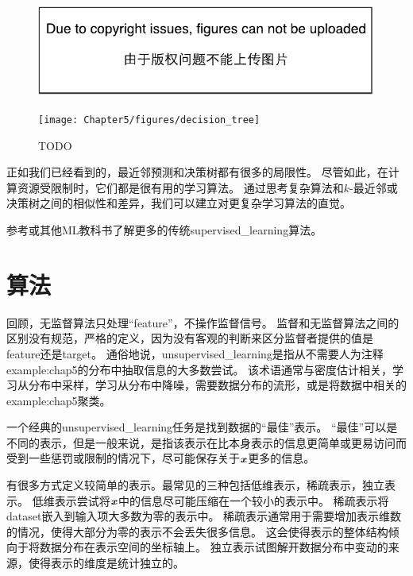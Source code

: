 \begin{figure}[!htb]
\ifOpenSource
\centerline{\includegraphics{figure.pdf}}
\else
\centerline{\texttt{[image: Chapter5/figures/decision\_tree]}}
\fi
\caption{TODO}
\label{fig:chap5_decision_tree}
\end{figure}

正如我们已经看到的，最近邻预测和决策树都有很多的局限性。
尽管如此，在计算资源受限制时，它们都是很有用的学习算法。
通过思考复杂算法和$k$-最近邻或决策树之间的相似性和差异，我们可以建立对更复杂学习算法的直觉。

参考\cite{MurphyBook2012,bishop-book2006,Hastie2001}或其他\gls{ML}教科书了解更多的传统\gls{supervised_learning}算法。

\section{算法}
\label{sec:unsupervised_learning_algorithms}
回顾，无监督算法只处理“\gls{feature}”，不操作监督信号。
监督和无监督算法之间的区别没有规范，严格的定义，因为没有客观的判断来区分监督者提供的值是\gls{feature}还是\gls{target}。
通俗地说，\gls{unsupervised_learning}是指从不需要人为注释\gls{example:chap5}的分布中抽取信息的大多数尝试。
该术语通常与密度估计相关，学习从分布中采样，学习从分布中降噪，需要数据分布的流形，或是将数据中相关的\gls{example:chap5}聚类。

一个经典的\gls{unsupervised_learning}任务是找到数据的“最佳”表示。
“最佳”可以是不同的表示，但是一般来说，是指该表示在比本身表示的信息更简单或更易访问而受到一些惩罚或限制的情况下，尽可能保存关于$\boldsymbol{\mathit{x}}$更多的信息。 


有很多方式定义较简单的表示。最常见的三种包括低维表示，稀疏表示，独立表示。
低维表示尝试将$\boldsymbol{\mathit{x}}$中的信息尽可能压缩在一个较小的表示中。
稀疏表示将\gls{dataset}嵌入到输入项大多数为零的表示中\citep{Barlow89,Olshausen+Field-1996,Hinton+Ghahramani-97}。
稀疏表示通常用于需要增加表示维数的情况，使得大部分为零的表示不会丢失很多信息。
这会使得表示的整体结构倾向于将数据分布在表示空间的坐标轴上。
独立表示试图解开数据分布中变动的来源，使得表示的维度是统计独立的。

